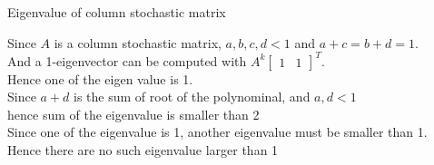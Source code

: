 \documentclass[12pt]{article}
\newenvironment{question}[2][Question]{\begin{trivlist}
    \item[\hskip \labelsep {\bfseries #1}\hskip \labelsep {\bfseries #2.}]}{\end{trivlist}}
\newenvironment{answer}[2][Answer]{\begin{trivlist}
    \item[\hskip \labelsep {\bfseries #1}\hskip \labelsep {\bfseries #2.}]}{\end{trivlist}}
\begin{document}
\begin{question}{Q. 2}
	Eigenvalue of column stochastic matrix 
\end{question}
\begin{answer}{Q. 2}
	\hfill \break
    Since $A$ is a column stochastic matrix, $a,b,c,d < 1$ and $a+c=b+d=1$. \\
    And a 1-eigenvector can be computed with $A^k \begin{bmatrix}1 & 1\end{bmatrix}^T$.  \\
    Hence one of the eigen value is 1. \\
    Since $a+d$ is the sum of root of the polynominal, and $a,d<1$ \\ hence sum of the eigenvalue is smaller than 2 \\
    Since one of the eigenvalue is 1, another eigenvalue must be smaller than 1. \\
    Hence there are no such eigenvalue larger than 1
\end{answer}
\end{document}
